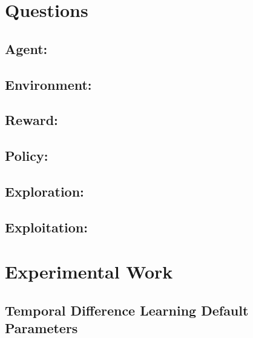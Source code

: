 \documentclass{assignment}
\date{\today}
\begin{document}
\section{Questions}
\subsection{Agent: }
\subsection{Environment: }
\subsection{Reward: }
\subsection{Policy: }
\subsection{Exploration: }
\subsection{Exploitation: }


\section{Experimental Work}
\subsection{Temporal Difference Learning Default Parameters}

\end{document}

